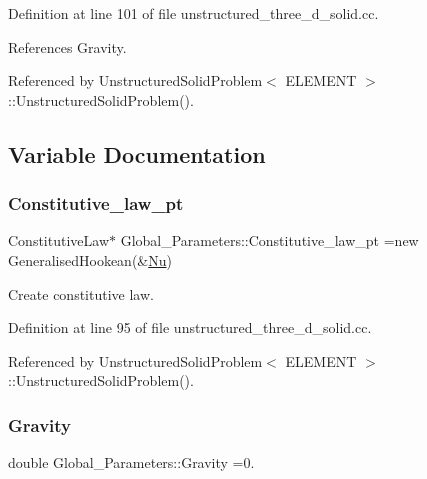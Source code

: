 Definition at line 101 of file unstructured\+\_\+three\+\_\+d\+\_\+solid.\+cc.



References Gravity.



Referenced by Unstructured\+Solid\+Problem$<$ E\+L\+E\+M\+E\+N\+T $>$\+::\+Unstructured\+Solid\+Problem().



\subsection{Variable Documentation}
\mbox{\label{namespaceGlobal__Parameters_adbd1f040f375c96fe56b3f475f7dbec2}} 
\subsubsection{\texorpdfstring{Constitutive\+\_\+law\+\_\+pt}{Constitutive\_law\_pt}}
{\footnotesize\ttfamily Constitutive\+Law$\ast$ Global\+\_\+\+Parameters\+::\+Constitutive\+\_\+law\+\_\+pt =new Generalised\+Hookean(\&\hyperlink{namespaceGlobal__Parameters_a20fccdcfa2c15ad8b951b9ada3bb1661}{Nu})}



Create constitutive law. 



Definition at line 95 of file unstructured\+\_\+three\+\_\+d\+\_\+solid.\+cc.



Referenced by Unstructured\+Solid\+Problem$<$ E\+L\+E\+M\+E\+N\+T $>$\+::\+Unstructured\+Solid\+Problem().

\mbox{\label{namespaceGlobal__Parameters_a335000b5db4206486a116ae0468d2d0c}} 
\subsubsection{\texorpdfstring{Gravity}{Gravity}}
{\footnotesize\ttfamily double Global\+\_\+\+Parameters\+::\+Gravity =0.}



